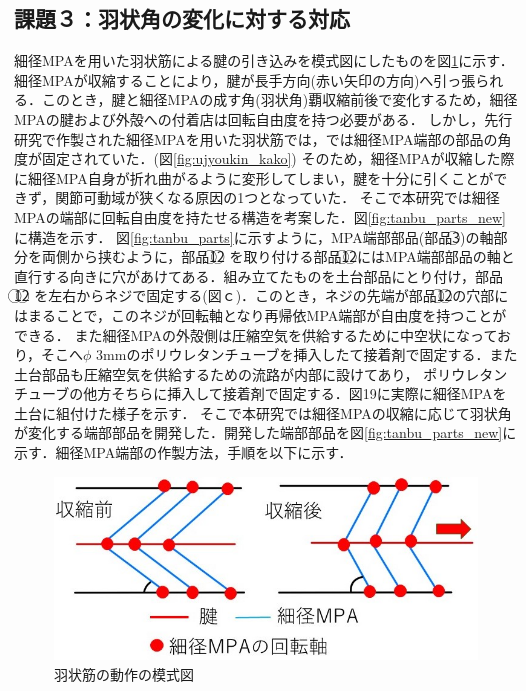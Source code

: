 \subsection{課題３：羽状角の変化に対する対応}
細径MPAを用いた羽状筋による腱の引き込みを模式図にしたものを図\ref{fig:ujyoukin_moshiki}に示す．
細径MPAが収縮することにより，腱が長手方向(赤い矢印の方向)へ引っ張られる．このとき，腱と細径MPAの成す角(羽状角)覇収縮前後で変化するため，細径MPAの腱および外殻への付着店は回転自由度を持つ必要がある．
しかし，先行研究\cite{hasegawa}で作製された細径MPAを用いた羽状筋では，では細径MPA端部の部品の角度が固定されていた．(図\ref{fig:ujyoukin_kako})
そのため，細径MPAが収縮した際に細径MPA自身が折れ曲がるように変形してしまい，腱を十分に引くことができず，関節可動域が狭くなる原因の1つとなっていた．
そこで本研究では細径MPAの端部に回転自由度を持たせる構造を考案した．図\ref{fig:tanbu_parts_new}に構造を示す．
図\ref{fig:tanbu_parts}に示すように，MPA端部部品(部品\textcircled{\scriptsize 3})の軸部分を両側から挟むように，部品\textcircled{\scriptsize 1}\textcircled{\scriptsize 2}
を取り付ける部品\textcircled{\scriptsize 1}\textcircled{\scriptsize 2}にはMPA端部部品の軸と直行する向きに穴があけてある．組み立てたものを土台部品にとり付け，部品\textcircled{\scriptsize 1}\textcircled{\scriptsize 2}
を左右からネジで固定する(図ｃ)．このとき，ネジの先端が部品\textcircled{\scriptsize 1}\textcircled{\scriptsize 2}の穴部にはまることで，このネジが回転軸となり再帰依MPA端部が自由度を持つことができる．
また細径MPAの外殻側は圧縮空気を供給するために中空状になっており，そこへ$\phi$ 3mmのポリウレタンチューブを挿入したて接着剤で固定する．また土台部品も圧縮空気を供給するための流路が内部に設けてあり，
ポリウレタンチューブの他方そちらに挿入して接着剤で固定する．図19に実際に細径MPAを土台に組付けた様子を示す．
そこで本研究では細径MPAの収縮に応じて羽状角が変化する端部部品を開発した．開発した端部部品を図\ref{fig:tanbu_parts_new}に示す．細径MPA端部の作製方法，手順を以下に示す．
%
\begin{figure}[ht]
  \centering
  \includegraphics[scale=0.5]{image/ujyoukin.jpg}
  \caption{羽状筋の動作の模式図}
  \label{fig:ujyoukin_moshiki}
\end{figure}
